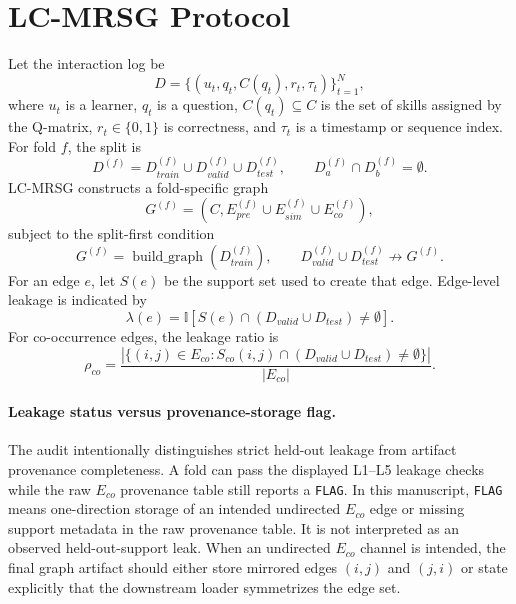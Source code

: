 \documentclass[11pt,a4paper]{article}
\newcommand{\Eco}{$E_{co}$}
\newcommand{\LCMRSG}{LC-MRSG}
\begin{document}
\section{LC-MRSG Protocol}
Let the interaction log be
\begin{equation}
D = \{(u_t,q_t,C(q_t),r_t,\tau_t)\}_{t=1}^{N},
\end{equation}
where $u_t$ is a learner, $q_t$ is a question, $C(q_t) \subseteq C$ is the set of skills assigned by the Q-matrix, $r_t \in \{0,1\}$ is correctness, and $\tau_t$ is a timestamp or sequence index. For fold $f$, the split is
\begin{equation}
D^{(f)}=D^{(f)}_{train}\cup D^{(f)}_{valid}\cup D^{(f)}_{test},\qquad D^{(f)}_a\cap D^{(f)}_b=\emptyset.
\end{equation}
\LCMRSG{} constructs a fold-specific graph
\begin{equation}
G^{(f)}=(C,E^{(f)}_{pre}\cup E^{(f)}_{sim}\cup E^{(f)}_{co}),
\end{equation}
subject to the split-first condition
\begin{equation}
G^{(f)}=\operatorname{build\_graph}(D^{(f)}_{train}),\qquad D^{(f)}_{valid}\cup D^{(f)}_{test} \nrightarrow G^{(f)}.
\end{equation}
For an edge $e$, let $S(e)$ be the support set used to create that edge. Edge-level leakage is indicated by
\begin{equation}
\lambda(e)=\mathbb{I}\left[S(e)\cap (D_{valid}\cup D_{test})\ne \emptyset\right].
\end{equation}
For co-occurrence edges, the leakage ratio is
\begin{equation}
\rho_{co}=\frac{|\{(i,j)\in E_{co}: S_{co}(i,j)\cap (D_{valid}\cup D_{test})\ne \emptyset\}|}{|E_{co}|}.
\end{equation}

\paragraph{Leakage status versus provenance-storage flag.}
The audit intentionally distinguishes strict held-out leakage from artifact provenance completeness. A fold can pass the displayed L1--L5 leakage checks while the raw \Eco{} provenance table still reports a \texttt{FLAG}. In this manuscript, \texttt{FLAG} means one-direction storage of an intended undirected \Eco{} edge or missing support metadata in the raw provenance table. It is not interpreted as an observed held-out-support leak. When an undirected \Eco{} channel is intended, the final graph artifact should either store mirrored edges $(i,j)$ and $(j,i)$ or state explicitly that the downstream loader symmetrizes the edge set.
\end{document}
